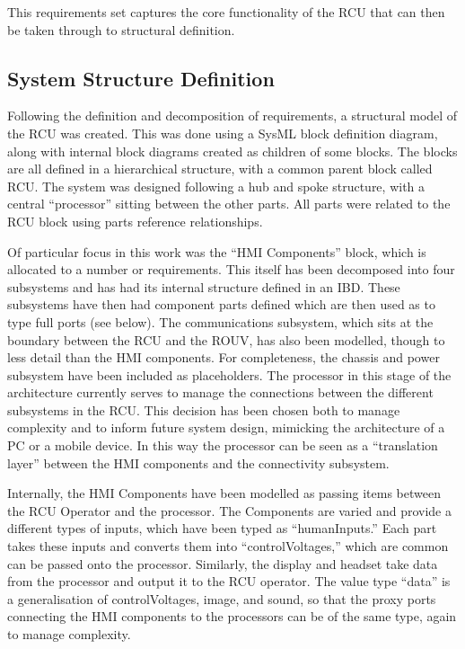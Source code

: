 \documentclass[../main.tex]{subfiles}
\begin{document}
This requirements set captures the core functionality of the RCU that can then be taken through to structural definition.

\subsection{System Structure Definition}

Following the definition and decomposition of requirements, a structural model of the RCU was created.
This was done using a SysML block definition diagram, along with internal block diagrams created as children of some blocks.
The blocks are all defined in a hierarchical structure, with a common parent block called RCU\@.
The system was designed following a hub and spoke structure, with a central ``processor'' sitting between the other parts.
All parts were related to the RCU block using parts reference relationships.

Of particular focus in this work was the ``HMI Components'' block, which is allocated to a number or requirements.
This itself has been decomposed into four subsystems and has had its internal structure defined in an IBD\@.
These subsystems have then had component parts defined which are then used as to type full ports (see below).
The communications subsystem, which sits at the boundary between the RCU and the ROUV, has also been modelled, though to less detail than the HMI components.
For completeness, the chassis and power subsystem have been included as placeholders.
The processor in this stage of the architecture currently serves to manage the connections between the different subsystems in the RCU\@.
This decision has been chosen both to manage complexity and to inform future system design, mimicking the architecture of a PC or a mobile device.
In this way the processor can be seen as a ``translation layer'' between the HMI components and the connectivity subsystem.

Internally, the HMI Components have been modelled as passing items between the RCU Operator and the processor.
The Components are varied and provide a different types of inputs, which have been typed as ``humanInputs.''
Each part takes these inputs and converts them into ``controlVoltages,'' which are common can be passed onto the processor.
Similarly, the display and headset take data from the processor and output it to the RCU operator.
The value type ``data'' is a generalisation of controlVoltages, image, and sound, so that the proxy ports connecting the HMI components to the processors can be of the same type, again to manage complexity.
\end{document}
